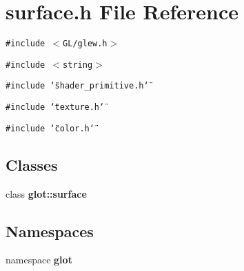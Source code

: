 \section{surface.h File Reference}
\label{surface_8h}
{\tt \#include $<$GL/glew.h$>$}\par
{\tt \#include $<$string$>$}\par
{\tt \#include \char`\"{}shader\_\-primitive.h\char`\"{}}\par
{\tt \#include \char`\"{}texture.h\char`\"{}}\par
{\tt \#include \char`\"{}color.h\char`\"{}}\par
\subsection*{Classes}
\begin{CompactItemize}
\item 
class {\bf glot::surface}
\end{CompactItemize}
\subsection*{Namespaces}
\begin{CompactItemize}
\item 
namespace {\bf glot}
\end{CompactItemize}
